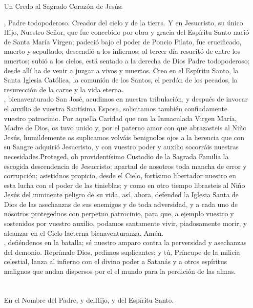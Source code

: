 \documentclass[./L00_main.tex]{subfiles}
\begin{document}
\bigskip
{\label{creed-apostles}}
Un Credo al Sagrado Corazón de Jesús:\\
\smallskip
\begin{minipage}[t]{0.475\textwidth}
    , Padre todopoderoso. Creador del cielo y de la tierra. Y en Jesucristo, su único Hijo, Nuestro Señor,
    que fue concebido por obra y gracia del Espíritu Santo nació de Santa María Vírgen; padeció bajo el poder de Poncio Pilato,
    fue crucificado, muerto y sepultado; descendió a los infiernos; al tercer día resucitó de entre los muertos; subió a los cielos,
    está sentado a la derecha de Dios Padre todopoderoso; desde allí ha de venir a juzgar a vivos y muertos.
    Creo en el Espíritu Santo, la Santa Iglesia Católica, la comunión de los Santos, el perdón de los pecados,
    la resurección de la carne y la vida eterna. \\

    , bienaventurado San José, acudimos en nuestra tribulación, y después de invocar el auxilio de vuestra Santísima Esposa, solicitamos
    también confiadamente vuestro patrocinio. Por aquella Caridad que con la Inmaculada Virgen María, Madre de Dios, os tuvo unido y, por el paterno amor 
    con que abrazasteis al Niño Jesús, humildemente os suplicamos volváis benignolos ojos a la herencia que con su Sangre adquirió Jesucristo, y con vuestro 
    poder y auxilio socorráis nuestras necesidades.Proteged, oh providentísimo Custodio de la Sagrada Familia la escogida descendencia de Jesucristo; 
    apartad de nosotros toda mancha de error y corrupción; asistidnos propicio, desde el Cielo, fortísimo libertador nuestro en esta lucha con el poder de
    las tinieblas; y como en otro tiempo librasteis al Niño Jesús del inminente peligro de su vida, así, ahora, defended la Iglesia Santa de Dios de las 
    asechanzas de sus enemigos y de toda adversidad, y a cada uno de nosotros protegednos con perpetuo patrocinio, para que, a ejemplo vuestro y sostenidos 
    por vuestro auxilio, podamos santamente vivir, piadosamente morir, y alcanzar en el Cielo laeterna bienaventuranza. Amén.\\

    , defiéndenos en la batalla; sé nuestro amparo contra la perversidad y asechanzas del demonio. Reprímale Dios, pedimos
    suplicantes; y tú, Príncupe de la milicia celestial, lanza al infierno con el divino poder a Satanás y a otros espíritus malignos que andan dispersos por el
    el mundo para la perdición de las almas. \\

    \\

    \\

    En el Nombre del Padre, y del{\redcross}Hijo, y del Espíritu Santo.
\end{minipage}
\end{document}
